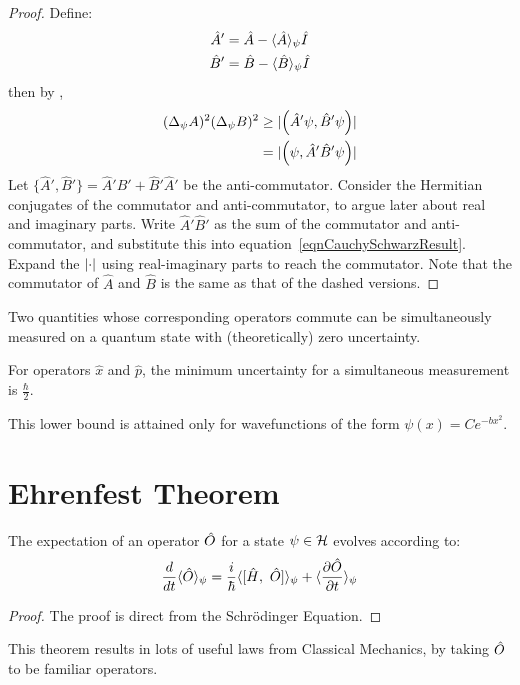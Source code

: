 \documentclass[../Main.tex]{subfiles}
\begin{document}
\begin{proof}
    Define:
    \begin{align}
        \hat{A}' &= \hat{A} - \langle \hat{A} \rangle_\psi \hat{I} \nonumber\\
        \hat{B}' &= \hat{B} - \langle \hat{B} \rangle_\psi \hat{I} \label{eqnCauchySchwarzResult}
    \end{align}
    then by ,
    \begin{align*}
        (\Delta_\psi A)^2(\Delta_\psi B)^2 &\geq \lvert\left(\hat{A}'\psi,\hat{B}'\psi\right)\rvert \\
        &= \lvert\left(\psi,\hat{A}'\hat{B}'\psi\right)\rvert
    \end{align*}
    Let $\{\hat{A}', \hat{B}'\} = \hat{A}'\hat{B}' + \hat{B}'\hat{A}'$ be the anti-commutator. Consider the Hermitian conjugates of the commutator and anti-commutator, to argue later about real and imaginary parts. Write $\hat{A}'\hat{B}'$ as the sum of the commutator and anti-commutator, and substitute this into equation~\ref{eqnCauchySchwarzResult}. Expand the $\lvert\cdot\rvert$ using real-imaginary parts to reach the commutator. Note that the commutator of $\hat{A}$ and $\hat{B}$ is the same as that of the dashed versions.
\end{proof}
\begin{corollary}
    Two quantities whose corresponding operators commute can be simultaneously measured on a quantum state with (theoretically) zero uncertainty.
    \label{corCommuteImpliesSimMeasure}
\end{corollary}
\begin{corollary}
    For operators $\hat{x}$ and $\hat{p}$, the minimum uncertainty for a simultaneous measurement is $\frac\hbar2$.
    \label{corHeisenbergUncertainty}
\end{corollary}
\begin{remark}
    This lower bound is attained only for wavefunctions of the form $\psi(x) = Ce^{-bx^2}$.
\end{remark}
\section{Ehrenfest Theorem}
\begin{theorem}
    The expectation of an operator $\hat{O}$ for a state $\psi \in \mathcal{H}$ evolves according to:
    \begin{equation*}
        \frac{d}{dt} \langle \hat{O} \rangle_\psi = \frac{i}{\hbar} \langle [\hat{H},~\hat{O}] \rangle_\psi + \langle \frac{\partial \hat{O}}{\partial t} \rangle_\psi
    \end{equation*}
    \label{thmEhrenfest}
\end{theorem}
\begin{proof}
    The proof is direct from the Schr\"odinger Equation.
\end{proof}
This theorem results in lots of useful laws from Classical Mechanics, by taking $\hat{O}$ to be familiar operators.
\end{document}

